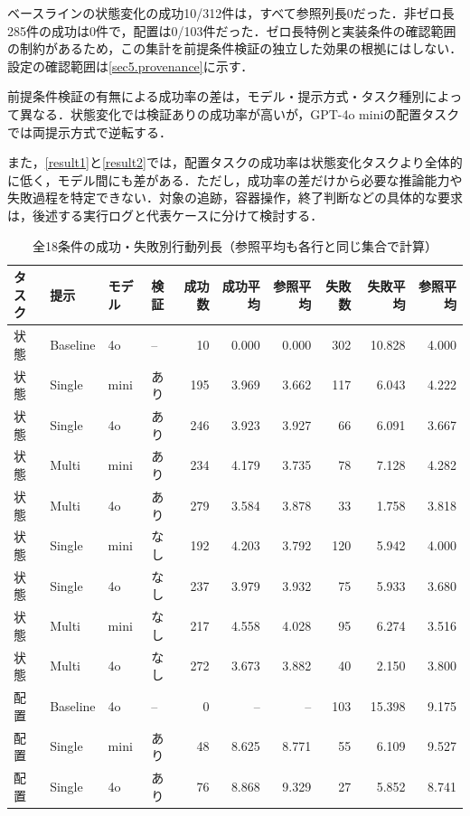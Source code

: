ベースラインの状態変化の成功10/312件は，すべて参照列長0だった．非ゼロ長285件の成功は0件で，配置は0/103件だった．ゼロ長特例と実装条件の確認範囲の制約があるため，この集計を前提条件検証の独立した効果の根拠にはしない．設定の確認範囲は\ref{sec5.provenance}に示す．

前提条件検証の有無による成功率の差は，モデル・提示方式・タスク種別によって異なる．状態変化では検証ありの成功率が高いが，GPT-4o miniの配置タスクでは両提示方式で逆転する．

また，\ref{result1}と\ref{result2}では，配置タスクの成功率は状態変化タスクより全体的に低く，モデル間にも差がある．ただし，成功率の差だけから必要な推論能力や失敗過程を特定できない．対象の追跡，容器操作，終了判断などの具体的な要求は，後述する実行ログと代表ケースに分けて検討する．

\begin{table}[tb]
\caption{全18条件の成功・失敗別行動列長（参照平均も各行と同じ集合で計算）}\label{tab:outcome_lengths}
\centering\small
\setlength{\tabcolsep}{3pt}
\begin{tabular}{llllrrrrrr}
\hline
タスク & 提示 & モデル & 検証 & 成功数 & 成功平均 & 参照平均 & 失敗数 & 失敗平均 & 参照平均 \\
\hline
状態 & Baseline & 4o & -- & 10 & 0.000 & 0.000 & 302 & 10.828 & 4.000 \\
状態 & Single & mini & あり & 195 & 3.969 & 3.662 & 117 & 6.043 & 4.222 \\
状態 & Single & 4o & あり & 246 & 3.923 & 3.927 & 66 & 6.091 & 3.667 \\
状態 & Multi & mini & あり & 234 & 4.179 & 3.735 & 78 & 7.128 & 4.282 \\
状態 & Multi & 4o & あり & 279 & 3.584 & 3.878 & 33 & 1.758 & 3.818 \\
状態 & Single & mini & なし & 192 & 4.203 & 3.792 & 120 & 5.942 & 4.000 \\
状態 & Single & 4o & なし & 237 & 3.979 & 3.932 & 75 & 5.933 & 3.680 \\
状態 & Multi & mini & なし & 217 & 4.558 & 4.028 & 95 & 6.274 & 3.516 \\
状態 & Multi & 4o & なし & 272 & 3.673 & 3.882 & 40 & 2.150 & 3.800 \\
配置 & Baseline & 4o & -- & 0 & -- & -- & 103 & 15.398 & 9.175 \\
配置 & Single & mini & あり & 48 & 8.625 & 8.771 & 55 & 6.109 & 9.527 \\
配置 & Single & 4o & あり & 76 & 8.868 & 9.329 & 27 & 5.852 & 8.741 \\

\end{tabular}
\end{table}
